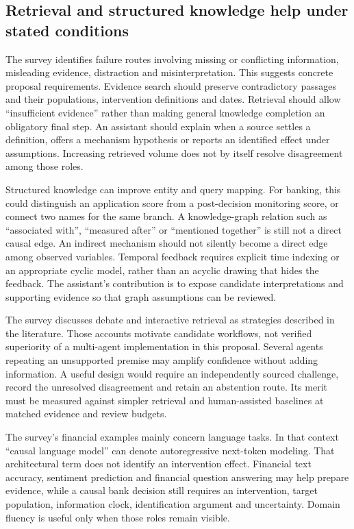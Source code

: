 \subsection{Retrieval and structured knowledge help under stated conditions}

The survey identifies failure routes involving missing or conflicting
information, misleading evidence, distraction and misinterpretation. This
suggests concrete proposal requirements. Evidence search should preserve
contradictory passages and their populations, intervention definitions and
dates. Retrieval should allow ``insufficient evidence'' rather than making
general knowledge completion an obligatory final step. An assistant should
explain when a source settles a definition, offers a mechanism hypothesis or
reports an identified effect under assumptions. Increasing retrieved volume
does not by itself resolve disagreement among those roles.

Structured knowledge can improve entity and query mapping. For banking, this
could distinguish an application score from a post-decision monitoring score,
or connect two names for the same branch. A knowledge-graph relation such as
``associated with'', ``measured after'' or ``mentioned together'' is still not
a direct causal edge. An indirect mechanism should not silently become a
direct edge among observed variables. Temporal feedback requires explicit
time indexing or an appropriate cyclic model, rather than an acyclic drawing
that hides the feedback. The assistant's contribution is to expose candidate
interpretations and supporting evidence so that graph assumptions can be
reviewed.

The survey discusses debate and interactive retrieval as strategies described
in the literature. Those accounts motivate candidate workflows, not verified
superiority of a multi-agent implementation in this proposal. Several agents
repeating an unsupported premise may amplify confidence without adding
information. A useful design would require an independently sourced challenge,
record the unresolved disagreement and retain an abstention route. Its merit
must be measured against simpler retrieval and human-assisted baselines at
matched evidence and review budgets.

The survey's financial examples mainly concern language tasks. In that context
``causal language model'' can denote autoregressive next-token modeling.
That architectural term does not identify an intervention effect. Financial
text accuracy, sentiment prediction and financial question answering may help
prepare evidence, while a causal bank decision still requires an intervention,
target population, information clock, identification argument and uncertainty.
Domain fluency is useful only when those roles remain visible.

